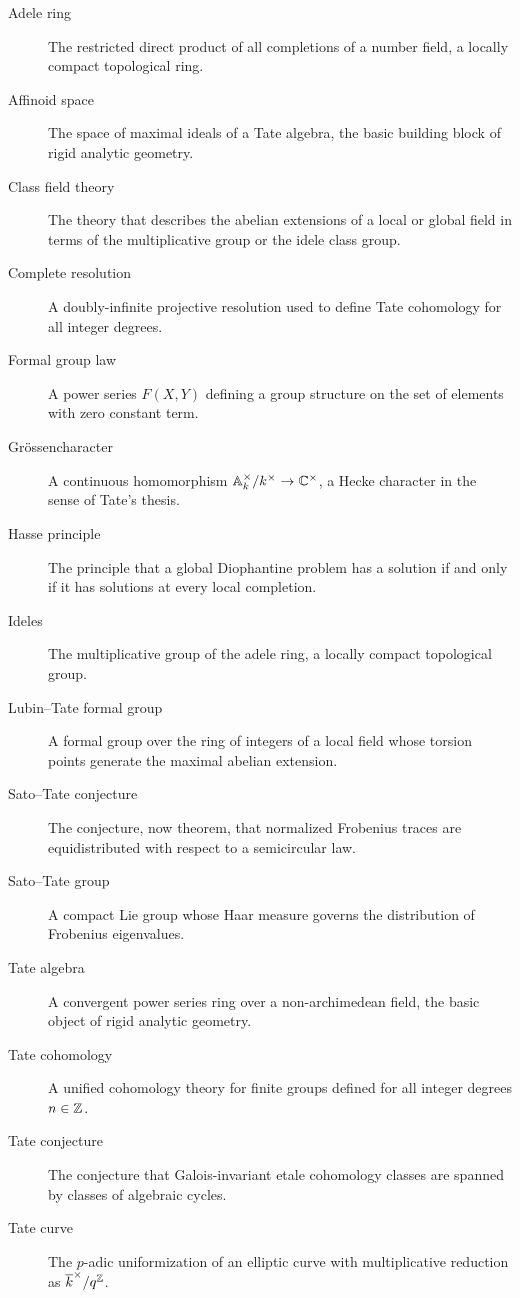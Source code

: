 \begin{description}
    \item[Adele ring] The restricted direct product of all completions of a number field, a locally compact topological ring.
    \item[Affinoid space] The space of maximal ideals of a Tate algebra, the basic building block of rigid analytic geometry.
    \item[Class field theory] The theory that describes the abelian extensions of a local or global field in terms of the multiplicative group or the idele class group.
    \item[Complete resolution] A doubly-infinite projective resolution used to define Tate cohomology for all integer degrees.
    \item[Formal group law] A power series \(F(X,Y)\) defining a group structure on the set of elements with zero constant term.
    \item[Gr\"ossencharacter] A continuous homomorphism \(\mathbb{A}_k^\times/k^\times \to \mathbb{C}^\times\), a Hecke character in the sense of Tate's thesis.
    \item[Hasse principle] The principle that a global Diophantine problem has a solution if and only if it has solutions at every local completion.
    \item[Ideles] The multiplicative group of the adele ring, a locally compact topological group.
    \item[Lubin--Tate formal group] A formal group over the ring of integers of a local field whose torsion points generate the maximal abelian extension.
    \item[Sato--Tate conjecture] The conjecture, now theorem, that normalized Frobenius traces are equidistributed with respect to a semicircular law.
    \item[Sato--Tate group] A compact Lie group whose Haar measure governs the distribution of Frobenius eigenvalues.
    \item[Tate algebra] A convergent power series ring over a non-archimedean field, the basic object of rigid analytic geometry.
    \item[Tate cohomology] A unified cohomology theory for finite groups defined for all integer degrees \(n \in \mathbb{Z}\).
    \item[Tate conjecture] The conjecture that Galois-invariant etale cohomology classes are spanned by classes of algebraic cycles.
    \item[Tate curve] The \(p\)-adic uniformization of an elliptic curve with multiplicative reduction as \(\overline{k}^\times / q^{\mathbb{Z}}\).

\end{description}

